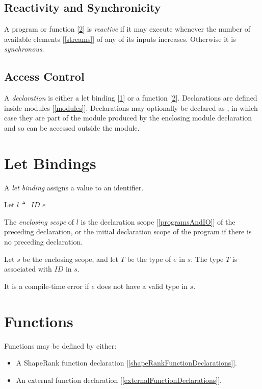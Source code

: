 \documentclass{article}
\begin{document}
\subsection{Reactivity and Synchronicity}
\label{reactivityAndSynchronicity}

A program or function [\ref{functions}] is {\em reactive} if it may execute whenever the number of available elements [\ref{streams}] of any of its inputs increases. Otherwise it is {\em synchronous}.

\subsection{Access Control}
\label{accessControl}

A {\em declaration} is either a let binding [\ref{letBindings}] or a function [\ref{functions}]. Declarations are defined inside modules [\ref{modules}]. Declarations may optionally be declared as \PUBLIC{}, in which case they are part of the module produced by the enclosing module declaration and so can be accessed outside the module.


\section{Let Bindings}
\label{letBindings}

A {\em let binding} assigns a value to an identifier. 

\LetBinding{}

Let  $l \triangleq $ \LET{} $ID$ \BIND{} $e$

The {\em enclosing scope} of $l$ is the declaration scope [\ref{programsAndIO}] of the preceding declaration, or the initial declaration scope of the program if there is no preceding declaration.

Let $s$ be the enclosing scope, and let $T$ be the type of $e$ in $s$.
The type $T$ is associated with $ID$ in $s$.

It is a compile-time error if $e$ does not have a valid type in $s$.


\section{Functions}
\label{functions}

Functions may be defined by either:
\begin{itemize}
\item A ShapeRank function declaration [\ref{shapeRankFunctionDeclarations}].
\item An external function declaration [\ref{externalFunctionDeclarations}]. 
\end{itemize}
\end{document}
